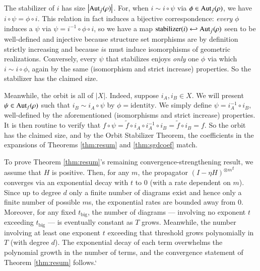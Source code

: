 \documentclass{article}
\theoremstyle{plain}
\theoremstyle{definition}
\newcommand{\wabs}[1]{\left|#1\right|}
\newcommand{\Aut}{\text{\textnormal{Aut}}}
\begin{document}
            The stabilizer of $i$ has size $\wabs{\Aut_{\tilde f}(\rho)}$.
            For, when $i \sim i \circ \psi$ via $\phi \in \Aut_{\tilde
            f}(\rho)$, we have $i\circ \psi = \phi \circ i$.  This relation in
            fact induces a bijective correspondence: \emph{every} $\phi$
            induces a $\psi$ via $\psi = i^{-1} \circ \phi \circ i$, so we have
            a map $\text{stabilizer}(i) \hookleftarrow \Aut_{\tilde f}(\rho)$
            seen to be well-defined and injective because structure set
            morphisms are by definition strictly increasing and because $i$s
            must induce isomorphisms of geometric realizations.  Conversely,
            every $\psi$ that stabilizes enjoys \emph{only} one $\phi$ via
            which $i \sim i \circ \phi$, again by the same (isomorphism and
            strict increase) properties.  So the stabilizer has the claimed
            size.

            Meanwhile, the orbit is all of $\wabs{X}$.  Indeed, suppose $i_A,
            i_B \in X$.  We will present $\psi \in \Aut_f(\rho)$ such that $i_B
            \sim i_A \circ \psi$ by $\phi=\text{identity}$.  We simply define
            $\psi = i_A^{-1} \circ i_B$, well-defined by the aforementioned
            (isomorphisms and strict increase) properties.  It is then routine
            to verify that
            $
                f \circ \psi
                =
                \tilde f \circ i_A \circ i_A^{-1} \circ i_B
                =
                \tilde f \circ i_B
                = f.
            $
            So the orbit has the claimed size, and by the Orbit Stabilizer
            Theorem, the coefficients in the expansions of Theorems 
            \ref{thm:resum} and \ref{thm:sgdcoef} match.

            To prove Theorem \ref{thm:resum}'s remaining
            convergence-strengthening result, we assume that $H$ is positive.
            Then, for any $m$, the propagator ${(I-\eta H)^{\otimes m}}^t$
            converges via an exponential decay with $t$ to $0$ (with a rate
            dependent on $m$).  Since up to degree $d$ only a finite number of
            diagrams exist and hence only a finite number of possible $m$s, the
            exponential rates are bounded away from $0$.  Moreover, for any
            fixed $t_{\text{big}}$, the number of diagrams --- involving no
            exponent $t$ exceeding $t_{\text{big}}$ --- is eventually constant
            as $T$ grows.  Meanwhile, the number involving at least one
            exponent $t$ exceeding that threshold grows polynomially in $T$
            (with degree $d$).  The exponential decay of each term overwhelms
            the polynomial growth in the number of terms, and the convergence
            statement of Theorem \ref{thm:resum} follows.`
\end{document}
